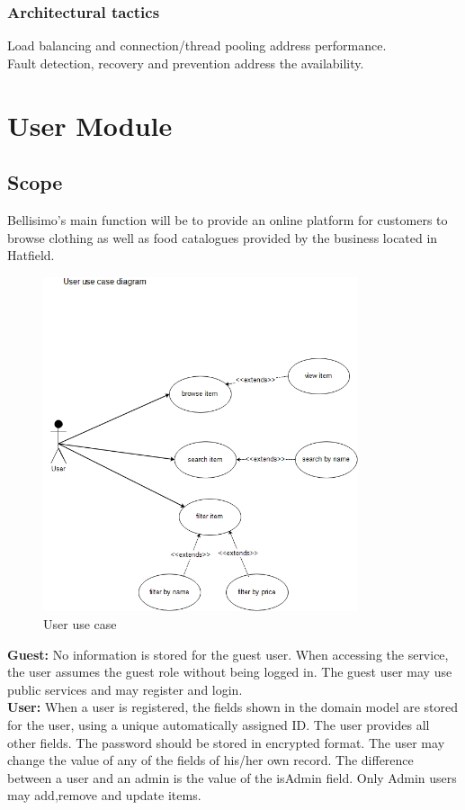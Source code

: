 \documentclass[12pt,a4paper]{article}
\begin{document}
	\subsubsection{Architectural tactics}
	Load balancing and connection/thread pooling address performance.\\
	Fault detection, recovery and prevention address the availability.

\section{User Module}
\subsection{Scope}
Bellisimo's main function will be to provide an online platform for customers to browse clothing as well as food catalogues provided by the business located in Hatfield.\\
\begin{figure}[!ht]
\includegraphics[width=350px]{Diagrams/user_usecase.jpg}
\caption{User use case}
\end{figure}
\textbf{Guest:} No information is stored for the guest user. When accessing the service, the user
assumes the guest role without being logged in. The guest user may use public services and
may register and login.\\
\textbf{User:} When a user is registered, the fields shown in the domain model are stored for the
user, using a unique automatically assigned ID. The user provides all other fields. The
password should be stored in encrypted format. The user may change the value of any of
the fields of his/her own record. The difference
between a user and an admin is the value of the isAdmin field. Only Admin users may
add,remove and update items.\newpage
\end{document}
